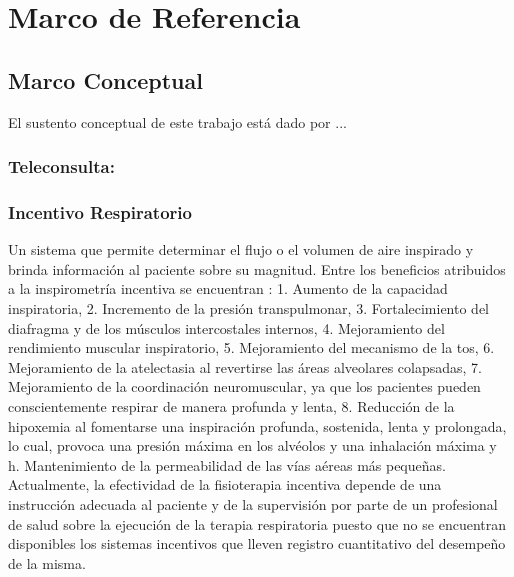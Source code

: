 \documentclass[12pt]{article}
\begin{document}
\newpage




\section{Marco de Referencia}

\subsection{Marco Conceptual}

El sustento conceptual de este trabajo está dado por ...


\subsubsection{Teleconsulta:}


\subsubsection{Incentivo Respiratorio}
 
Un sistema que permite determinar el flujo o el volumen de aire inspirado y brinda informaci\'on al paciente sobre su magnitud.  Entre los beneficios atribuidos a la inspirometr\'ia incentiva se encuentran \cite{12}: 1. Aumento de la capacidad inspiratoria, 2. Incremento de la presi\'on transpulmonar, 3. Fortalecimiento del diafragma y de los m\'usculos intercostales internos, 4. Mejoramiento del rendimiento muscular inspiratorio, 5. Mejoramiento del mecanismo de la tos,  6. Mejoramiento de la atelectasia al revertirse las \'areas alveolares colapsadas, 7. Mejoramiento de la coordinaci\'on neuromuscular, ya que los pacientes pueden conscientemente respirar de manera profunda y lenta, 8. Reducci\'on de la hipoxemia al fomentarse una inspiraci\'on profunda, sostenida, lenta y prolongada, lo cual, provoca una presi\'on m\'axima en los alv\'eolos y una inhalaci\'on m\'axima y h.  Mantenimiento de la permeabilidad de las v\'ias a\'ereas m\'as peque\~{n}as. Actualmente, la efectividad de la fisioterapia incentiva depende de una instrucci\'on adecuada al paciente y de la supervisi\'on por parte de un profesional de salud sobre la ejecuci\'on de la terapia respiratoria \cite{13} puesto que no se encuentran disponibles los sistemas incentivos que lleven registro cuantitativo del desempe\~{n}o de la misma.
\end{document}
